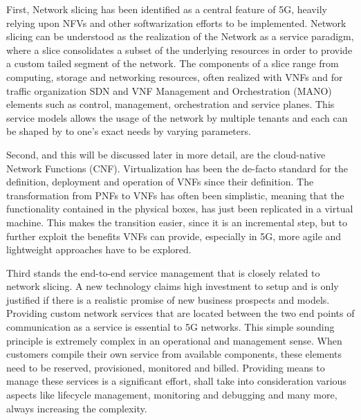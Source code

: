 First, Network slicing has been identified as a central feature of 5G, heavily relying upon NFVs and other softwarization efforts to be implemented. Network slicing can be understood as the realization of the Network as a service paradigm, where a slice consolidates a subset of the underlying resources in order to provide a custom tailed segment of the network. The components of a slice range from computing, storage and networking resources, often realized with VNFs and for traffic organization SDN and VNF Management and Orchestration (MANO) elements such as control, management, orchestration and service planes. This service models allows the usage of the network by multiple tenants and each can be shaped by to one's exact needs by varying parameters.
 
Second, and this will be discussed later in more detail, are the cloud-native Network Functions (CNF).  Virtualization has been the de-facto standard for the definition, deployment and operation of VNFs since their definition. The transformation from PNFs to VNFs has often been simplistic, meaning that the functionality contained in the physical boxes, has just been replicated in a virtual machine. This makes the transition easier, since it is an incremental step, but to further exploit the benefits VNFs can provide, especially in 5G, more agile and lightweight approaches have to be explored. 

Third stands the end-to-end service management that is closely related to network slicing. A new technology claims high investment to setup and is only justified if there is a realistic promise of new business prospects and models. Providing custom network services that are located between the two end points of communication as a service is essential to 5G networks. This simple sounding principle is extremely complex in an operational and management sense. When customers compile their own service from available components, these elements need to be reserved, provisioned, monitored and billed. Providing means to manage these services is a significant effort, shall take into consideration various aspects like lifecycle management, monitoring and debugging and many more, always increasing the complexity. 

